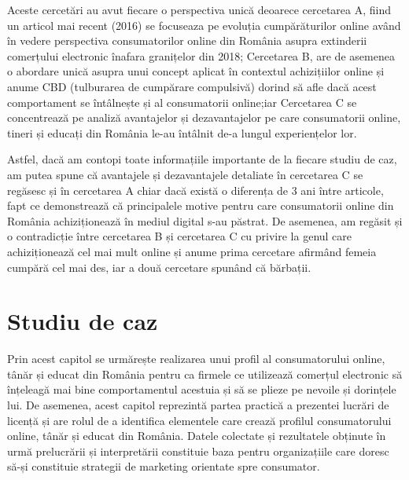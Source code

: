 \documentclass[a4paper, 12pt]{article}
\begin{document}
\bigskip
		\qquad Aceste cercetări au avut fiecare o perspectiva unică deoarece cercetarea A, fiind un articol mai recent (2016) se focuseaza pe evoluția cumpărăturilor online având în vedere perspectiva consumatorilor online din România asupra extinderii comerțului electronic înafara granițelor din 2018; Cercetarea B, are de asemenea o abordare unică asupra unui concept aplicat în contextul achizițiilor online și anume CBD (tulburarea de cumpărare compulsivă) dorind să afle dacă acest comportament se întâlnește și al consumatorii online;iar Cercetarea C se concentrează pe analiză avantajelor și dezavantajelor pe care consumatorii online, tineri și educați din România le-au întâlnit de-a lungul experiențelor lor.
		
		\quad Astfel, dacă am contopi toate informațiile importante de la fiecare studiu de caz, am putea spune că avantajele și dezavantajele detaliate în cercetarea C se regăsesc și în cercetarea A chiar dacă există o diferența de 3 ani între articole, fapt ce demonstrează că principalele motive pentru care consumatorii online din România achiziționează în mediul digital s-au păstrat. De asemenea, am regăsit și o contradicție între cercetarea B și cercetarea C cu privire la genul care achiziționează cel mai mult online și anume prima cercetare afirmând femeia cumpără cel mai des, iar a două cercetare spunând că bărbații.
	
	
	
	
\newpage	
	\section{Studiu de caz }
	
	\quad\quad   Prin acest capitol se urmărește realizarea unui profil al consumatorului online, tânăr și educat din România pentru ca firmele ce utilizează comerțul electronic să înțeleagă mai bine comportamentul acestuia și să se plieze pe nevoile și dorințele lui. De asemenea, acest capitol reprezintă partea practică a prezentei lucrări de licență și are rolul de a identifica elementele care crează profilul consumatorului online, tânăr și educat din România. Datele colectate și rezultatele obținute în urmă prelucrării și interpretării constituie baza pentru organizațiile care doresc să-și constituie strategii de marketing orientate spre consumator.
\end{document}
